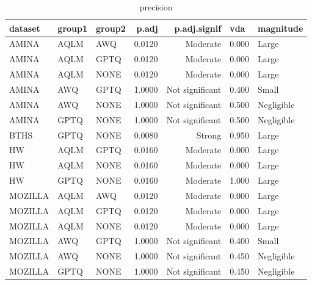 \begin{table}
\caption{precision}
\begin{tabular}{lllrrll}
\toprule
dataset & group1 & group2 & p.adj & p.adj.signif & vda & magnitude \\
\midrule
AMINA & AQLM & AWQ & 0.0120 & Moderate & 0.000 & Large \\
AMINA & AQLM & GPTQ & 0.0120 & Moderate & 0.000 & Large \\
AMINA & AQLM & NONE & 0.0120 & Moderate & 0.000 & Large \\
AMINA & AWQ & GPTQ & 1.0000 & Not significant & 0.400 & Small \\
AMINA & AWQ & NONE & 1.0000 & Not significant & 0.500 & Negligible \\
AMINA & GPTQ & NONE & 1.0000 & Not significant & 0.500 & Negligible \\
BTHS & GPTQ & NONE & 0.0080 & Strong & 0.950 & Large \\
HW & AQLM & GPTQ & 0.0160 & Moderate & 0.000 & Large \\
HW & AQLM & NONE & 0.0160 & Moderate & 0.000 & Large \\
HW & GPTQ & NONE & 0.0160 & Moderate & 1.000 & Large \\
MOZILLA & AQLM & AWQ & 0.0120 & Moderate & 0.000 & Large \\
MOZILLA & AQLM & GPTQ & 0.0120 & Moderate & 0.000 & Large \\
MOZILLA & AQLM & NONE & 0.0120 & Moderate & 0.000 & Large \\
MOZILLA & AWQ & GPTQ & 1.0000 & Not significant & 0.400 & Small \\
MOZILLA & AWQ & NONE & 1.0000 & Not significant & 0.450 & Negligible \\
MOZILLA & GPTQ & NONE & 1.0000 & Not significant & 0.450 & Negligible \\
\bottomrule
\end{tabular}
\end{table}
